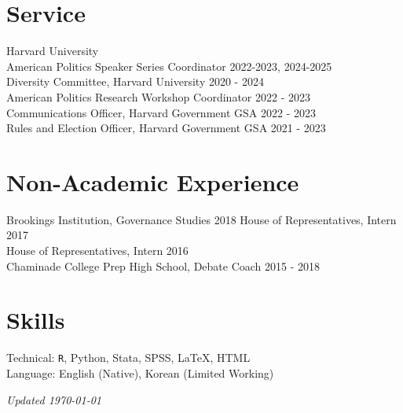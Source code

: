 \documentclass[margin, line]{res}
\begin{document}
\begin{resume}
\section{Service}
Harvard University\\
\hspace*{5mm} American Politics Speaker Series Coordinator \hfill 2022-2023, 2024-2025\\
\hspace*{5mm} Diversity Committee, Harvard University \hfill 2020 - 2024\\
\hspace*{5mm} American Politics Research Workshop Coordinator \hfill 2022 - 2023\\
\hspace*{5mm} Communications Officer, Harvard Government GSA \hfill 2022 - 2023\\
\hspace*{5mm} Rules and Election Officer, Harvard Government GSA \hfill 2021 - 2023\\

\section{Non-Academic Experience}
Brookings Institution, Governance Studies \hfill 2018
House of Representatives, Intern \hfill 2017\\
House of Representatives, Intern \hfill 2016\\
Chaminade College Prep High School, Debate Coach \hfill 2015 - 2018

\section{Skills}
Technical: \texttt{R}, Python, Stata, SPSS, \LaTeX, HTML\\
Language: English (Native), Korean (Limited Working)

\vspace*{\fill}

\hfill \small{\textit{Updated \today}}

\end{resume}
\end{document}
